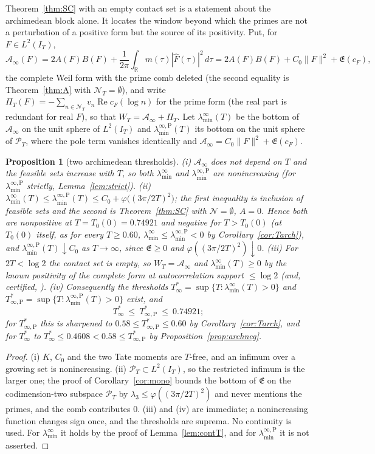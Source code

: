\documentclass[11pt]{amsart}
\newtheorem{proposition}[theorem]{Proposition}
\theoremstyle{definition}
\theoremstyle{remark}
\newcommand{\R}{\mathbb R}
\newcommand{\Rel}{\operatorname{Re}}
\newcommand{\PT}{\mathcal P_T}
\newcommand{\IT}{I_T}
\newcommand{\Fh}{\widehat F}
\newcommand{\cF}{c_F}
\newcommand{\Lev}{\mathfrak E}
\newcommand{\NT}{\mathcal N_T}
\newcommand{\Ainf}{\mathcal A_\infty}
\newcommand{\PiT}{\Pi_T}
\newcommand{\laminf}{\lambda^{\infty}_{\min}}
\newcommand{\laminfP}{\lambda^{\infty,\mathrm P}_{\min}}
\begin{document}
Theorem~\ref{thm:SC} with an empty contact set is a statement about the archimedean block alone. It
locates the window beyond which the primes are not a perturbation of a positive form but the source
of its positivity. Put, for $F\in L^2(\IT)$,
\[
\Ainf(F)=2A(F)B(F)+\frac1{2\pi}\int_\R m(\tau)|\Fh(\tau)|^2\,d\tau
=2A(F)B(F)+C_0\|F\|^2+\Lev(\cF),
\]
the complete Weil form with the prime comb deleted (the second equality is Theorem~\ref{thm:A} with
$\NT=\emptyset$), and write $\PiT(F)=-\sum_{n\in\NT}v_n\Rel\cF(\log n)$ for the prime form (the real part is redundant for real $F$), so that
$W_T=\Ainf+\PiT$. Let $\laminf(T)$ be the bottom of $\Ainf$ on the unit sphere of $L^2(\IT)$ and
$\laminfP(T)$ its bottom on the unit sphere of $\PT$, where the pole term vanishes identically and
$\Ainf=C_0\|F\|^2+\Lev(\cF)$.

\begin{proposition}[two archimedean thresholds]\label{prop:arch}
\emph{(i)} $\Ainf$ does not depend on $T$ and the feasible sets increase with $T$, so both
$\laminf$ and $\laminfP$ are nonincreasing (for $\laminfP$ strictly, Lemma~\ref{lem:strict}).
\emph{(ii)} $\laminf(T)\le\laminfP(T)\le C_0+\varphi\big((3\pi/2T)^2\big)$; the first inequality is
inclusion of feasible sets and the second is Theorem~\ref{thm:SC} with $\mathcal N=\emptyset$,
$A=0$. Hence both are nonpositive at $T=T_0(0)=0.74921$ and negative for $T>T_0(0)$ (at $T_0(0)$
itself, as for every $T\ge0.60$, $\laminf\le\laminfP<0$ by Corollary~\ref{cor:Tarch}), and $\laminfP(T)\downarrow C_0$ as
$T\to\infty$, since $\Lev\ge0$ and $\varphi((3\pi/2T)^2)\downarrow0$.
\emph{(iii)} For $2T<\log2$ the contact set is empty, so $W_T=\Ainf$ and $\laminf(T)\ge0$ by the
known positivity of the complete form at autocorrelation support $\le\log2$
\textup{\cite{Yoshida1992,Bombieri2000}} (and, certified, \cite[Thm.~1.2]{Zhu2026}).
\emph{(iv)} Consequently the thresholds
$T^*_\infty=\sup\{T:\laminf(T)>0\}$ and $T^*_{\infty,\mathrm P}=\sup\{T:\laminfP(T)>0\}$ exist, and
\[
T^*_\infty\ \le\ T^*_{\infty,\mathrm P}\ \le\ 0.74921 ;
\]
for $T^*_{\infty,\mathrm P}$ this is sharpened to $0.58\le T^*_{\infty,\mathrm P}\le0.60$ by
Corollary~\ref{cor:Tarch}, and for $T^*_\infty$ to $T^*_\infty\le0.4608<0.58\le T^*_{\infty,\mathrm P}$ by
Proposition~\ref{prop:archneg}.
\end{proposition}
\begin{proof}
(i) $K$, $C_0$ and the two Tate moments are $T$-free, and an infimum over a growing set is
nonincreasing. (ii) $\PT\subset L^2(\IT)$, so the restricted infimum is the larger one; the proof of
Corollary~\ref{cor:mono} bounds the bottom of $\Lev$ on the codimension-two subspace $\PT$ by
$\lambda_3\le\varphi((3\pi/2T)^2)$ and never mentions the primes, and the comb contributes $0$.
(iii) and (iv) are immediate; a nonincreasing function changes sign once, and the thresholds are
suprema. No continuity is used. For $\laminf$ it holds by the proof of Lemma~\ref{lem:contT}, and for
$\laminfP$ it is not asserted.
\end{proof}
\end{document}
